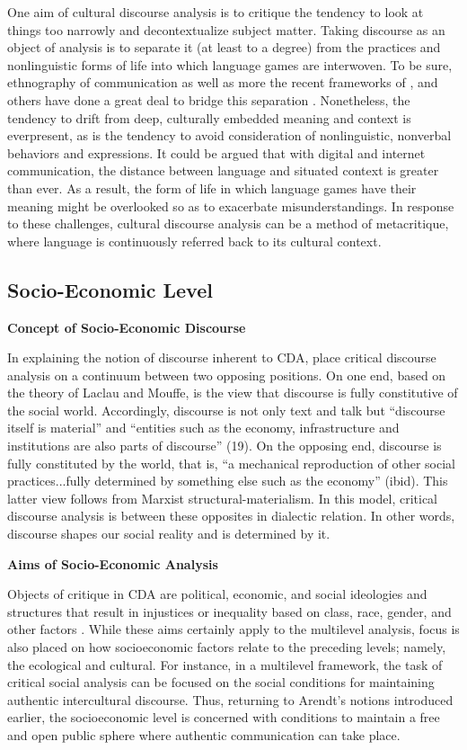 One aim of cultural discourse analysis is to critique the tendency to look at things too narrowly and decontextualize subject matter. Taking discourse as an object of analysis is to separate it (at least to a degree) from the practices and nonlinguistic forms of life into which language games are interwoven. To be sure, ethnography of communication \citep{Hymes1972a} as well as more the recent frameworks of \cite{Blommaert2005a}, \cite{Shi-xu2005a} and others have done a great deal to bridge this separation \citep[see][for an overview]{Scollo2011a}. Nonetheless, the tendency to drift from deep, culturally embedded meaning and context is everpresent, as is the tendency to avoid consideration of nonlinguistic, nonverbal behaviors and expressions. It could be argued that with digital and internet communication, the distance between language and situated context is greater than ever. As a result, the form of life in which language games have their meaning might be overlooked so as to exacerbate misunderstandings. In response to these challenges, cultural discourse analysis can be a method of metacritique, where language is continuously referred back to its cultural context.

\subsection{Socio-Economic Level}

\textbf{Concept of Socio-Economic Discourse}

In explaining the notion of discourse inherent to CDA, \cite*{Jorgensen2002a} place critical discourse analysis on a continuum between two opposing positions. On one end, based on the theory of Laclau and Mouffe, is the view that discourse is fully constitutive of the social world. Accordingly, discourse is not only text and talk but ``discourse itself is material'' and ``entities such as the economy, infrastructure and institutions are also parts of discourse'' (19). On the opposing end, discourse is fully constituted by the world, that is, ``a mechanical reproduction of other social practices...fully determined by something else such as the economy'' (ibid). This latter view follows from Marxist structural-materialism. In this model, critical discourse analysis is between these opposites in dialectic relation. In other words, discourse shapes our social reality and is determined by it.

\textbf{Aims of Socio-Economic Analysis}

Objects of critique in CDA are political, economic, and social ideologies and structures that result in injustices or inequality based on class, race, gender, and other factors \citep[250]{VanDijk1993}. While these aims certainly apply to the multilevel analysis, focus is also placed on how socioeconomic factors relate to the preceding levels; namely, the ecological and cultural. For instance, in a multilevel framework, the task of critical social analysis can be focused on the social conditions for maintaining authentic intercultural discourse. Thus, returning to Arendt's notions introduced earlier, the socioeconomic level is concerned with conditions to maintain a free and open public sphere where authentic communication can take place.


